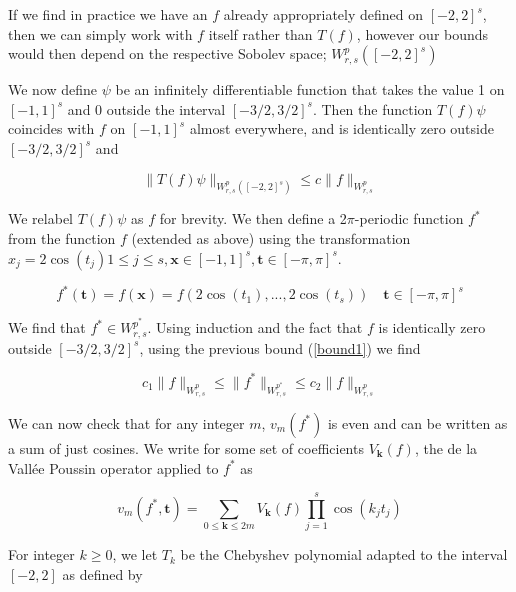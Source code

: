 \documentclass[11pt,a4paper]{article}
\theoremstyle{plain}
\theoremstyle{definition}
\theoremstyle{remark}
\begin{document}
If we find in practice we have an \(f\) already appropriately defined on \([-2,2]^s\), then we can simply work with \(f\) itself rather than \(T(f)\), however our bounds would then depend on the respective Sobolev space; \(W_{r,s}^{p}([-2,2]^s)\) 

We now define \(\psi \) be an infinitely differentiable function that takes the value 1 on \([-1,1]^s\) and \(0\)  outside the interval \([-3/2,3/2]^s\). Then the function \(T(f)\psi \) coincides with \(f\) on \([-1,1]^s\) almost everywhere, and is identically zero outside \([-3/2,3/2]^s\) and

\begin{equation}
    \|T(f)\psi\|_{W_{r,s}^{p}([-2,2]^s)} \leq c \|f\|_{W_{r,s}^{p}}  
    \label{bound1}
\end{equation}

We relabel \(T(f)\psi\) as \(f\) for brevity. We then define a 2\(\pi\)-periodic function \(f^*\) from the function \(f\) (extended as above) using the transformation \(x_{j} = 2 \cos (t_{j}) 1 \leq j \leq s, \mathbf{x} \in [-1,1]^s, \mathbf{t} \in [-\pi ,\pi ]^s\).

\begin{equation}    
    f^*(\mathbf{t}) = f(\mathbf{x}) = f(2 \cos(t_1),...,2 \cos(t_s)) \quad \mathbf{t} \in [-\pi ,\pi ]^s
\end{equation}

We find that \(f^{\ast} \in W_{r,s}^{p^{\ast}}\). Using induction and the fact that \(f\) is identically zero outside \([-3/2,3/2]^s\), using the previous bound (\ref{bound1}) we find

\begin{equation}
    c_{1} \|f\|_{W_{r,s}^{p}} \leq \|f^{\ast}\|_{W_{r,s}^{p^{\ast}}} \leq c_{2} \|f\|_{W_{r,s}^{p}}
\end{equation}

We can now check that for any integer \(m\), \(v_{m}(f^{\ast} )\) is even and can be written as a sum of just cosines. We write for some set of coefficients \(V_{\mathbf{k} }(f)\), the de la Vallée Poussin operator applied to \(f^{\ast}\) as

\begin{equation}
    v_{m}(f^{\ast}, \mathbf{t} ) = \sum_{0 \leq \mathbf{k} \leq 2m} V_{\mathbf{k}}(f) \prod_{j=1}^{s} \cos(k_{j}t_{j})
\end{equation}

For integer \(k \geq 0 \), we let \(T_{k}\) be the Chebyshev polynomial adapted to the interval \([-2,2]\) as defined by
\end{document}
